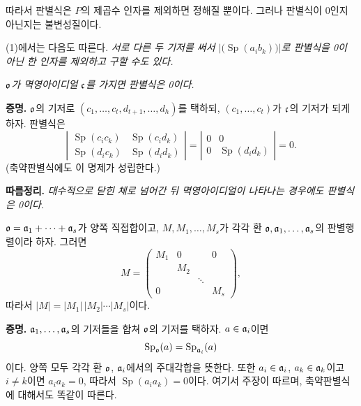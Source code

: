 따라서 판별식은 \(P\)의 제곱수 인자를 제외하면 정해질 뿐이다. 그러나 판별식이 0인지 아닌지는 불변성질이다.

(1)에서는 다음도 따른다. \emph{서로 다른 두 기저를 써서 \(\left|\bigl(\operatorname{Sp}(a_i b_k)\bigr)\right|\)로 판별식을 0이 아닌 한 인자를 제외하고 구할 수도 있다.}

\noindent\emph{\(\mathfrak o\)가 멱영아이디얼 \(\mathfrak c\)를 가지면 판별식은 0이다.}

\textbf{증명.} \(\mathfrak o\)의 기저로 \((c_1,\ldots,c_t,d_{t+1},\ldots,d_h)\)를 택하되, \((c_1,\ldots,c_t)\)가 \(\mathfrak c\)의 기저가 되게 하자. 판별식은
\[
\left|\begin{array}{cc}
\operatorname{Sp}(c_i c_k)&\operatorname{Sp}(c_i d_k)\\
\operatorname{Sp}(d_i c_k)&\operatorname{Sp}(d_i d_k)
\end{array}\right|
=
\left|\begin{array}{cc}
0&0\\
0&\operatorname{Sp}(d_i d_k)
\end{array}\right|=0.
\]
(축약판별식에도 이 명제가 성립한다.)

\textbf{따름정리.} \emph{대수적으로 닫힌 체로 넘어간 뒤 멱영아이디얼이 나타나는 경우에도 판별식은 0이다.}

\(\mathfrak o=\mathfrak{a}_1+\cdots+\mathfrak{a}_s\)가 양쪽 직접합이고, \(M,M_1,\ldots,M_s\)가 각각 환 \(\mathfrak o,\mathfrak{a}_1,\ldots,\mathfrak{a}_s\)의 판별행렬이라 하자. 그러면
\[
M=\begin{pmatrix}
M_1&0& &0\\
 &M_2& &\\
 & &\ddots&\\
0& & &M_s
\end{pmatrix},
\]
따라서 \(|M|=|M_1|\,|M_2|\cdots|M_s|\)이다.

\textbf{증명.} \(\mathfrak{a}_1,\ldots,\mathfrak{a}_s\)의 기저들을 합쳐 \(\mathfrak o\)의 기저를 택하자. \(a\in\mathfrak{a}_i\)이면
\[
        \operatorname{Sp}_{\mathfrak o}(a)
        =\operatorname{Sp}_{\mathfrak{a}_i}(a)
\]
이다. 양쪽 모두 각각 환 \(\mathfrak o\), \(\mathfrak{a}_i\)에서의 주대각합을 뜻한다. 또한 \(a_i\in\mathfrak{a}_i\), \(a_k\in\mathfrak{a}_k\)이고 \(i\ne k\)이면 \(a_i a_k=0\), 따라서 \(\operatorname{Sp}(a_i a_k)=0\)이다. 여기서 주장이 따르며, 축약판별식에 대해서도 똑같이 따른다.

